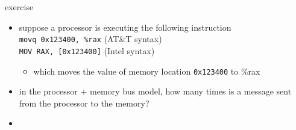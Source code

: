 \begin{frame}{exercise}
    \begin{itemize}
    \item suppose a processor is executing the following instruction \\
        \texttt{movq 0x123400, \%rax} (AT\&T syntax) \\
        \texttt{MOV RAX, [0x123400]} (Intel syntax)
        \begin{itemize}
            \item which moves the value of memory location \texttt{0x123400} to \%rax
        \end{itemize}
    \item in the processor + memory bus model, how many times is a message sent
        from the processor to the memory?
    \item<2> \iftoggle{heldback}{~}{answer: 2 (retrieve instruction + ask for address 0x123400)}
    \end{itemize}
\end{frame}
